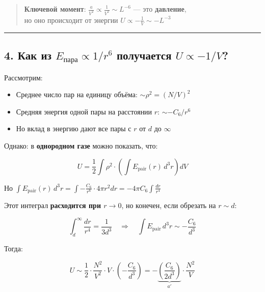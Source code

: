 \documentclass[11pt]{article}
\providecommand{\tightlist}{%
      \setlength{\itemsep}{0pt}\setlength{\parskip}{0pt}}
\begin{document}
\begin{quote}
\textbf{Ключевой момент}:
\(\frac{a}{V^2} \propto \frac{1}{V^2} \sim L^{-6}\) --- это
\textbf{давление},\\
но оно происходит от энергии \(U \propto -\frac{1}{V} \sim -L^{-3}\)
\end{quote}

\begin{center}\rule{0.5\linewidth}{\linethickness}\end{center}

\subsection{\texorpdfstring{4. Как из \(E_{\text{пара}} \propto 1/r^6\)
получается
\(U \propto -1/V\)?}{4. Как из E\_\{\textbackslash{}text\{пара\}\} \textbackslash{}propto 1/r\^{}6 получается U \textbackslash{}propto -1/V?}}\label{ux43aux430ux43a-ux438ux437-e_textux43fux430ux440ux430-propto-1r6-ux43fux43eux43bux443ux447ux430ux435ux442ux441ux44f-u-propto--1v}

Рассмотрим:

\begin{itemize}
\tightlist
\item
  Среднее число пар на единицу объёма: \(\sim \rho^2 = (N/V)^2\)
\item
  Средняя энергия одной пары на расстоянии \(r\): \(\sim -C_6 / r^6\)
\item
  Но вклад в энергию дают все пары с \(r\) от \(d\) до \(\infty\)
\end{itemize}

Однако: в \textbf{однородном газе} можно показать, что:

\[
U = \frac{1}{2} \int \rho^2 \cdot \left( \int E_{\text{pair}}(r)\, d^3r \right) dV
\]

Но
\(\int E_{\text{pair}}(r)\, d^3r = \int -\frac{C_6}{r^6} \cdot 4\pi r^2 dr = -4\pi C_6 \int \frac{dr}{r^4}\)

Этот интеграл \textbf{расходится при \(r \to 0\)}, но конечен, если
обрезать на \(r \sim d\):

\[
\int_d^\infty \frac{dr}{r^4} = \frac{1}{3d^3}
\quad \Rightarrow \quad \int E_{\text{pair}}\, d^3r \sim -\frac{C_6}{d^3}
\]

Тогда:

\[
U \sim \frac{1}{2} \cdot \frac{N^2}{V^2} \cdot V \cdot \left( -\frac{C_6}{d^3} \right) = -\underbrace{\left( \frac{C_6}{2d^3} \right)}_{a'} \cdot \frac{N^2}{V}
\]
\end{document}
